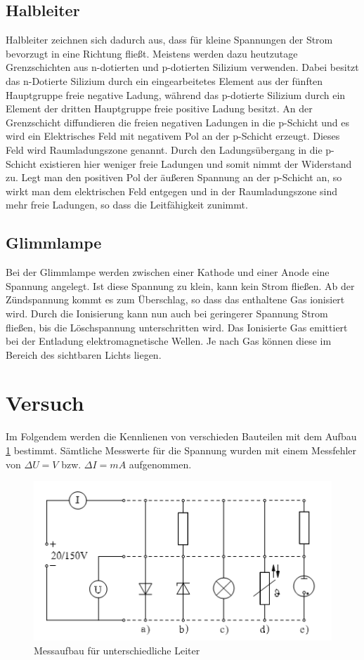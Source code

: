 \subsection{Halbleiter}
Halbleiter zeichnen sich dadurch aus, dass für kleine Spannungen der Strom bevorzugt in eine Richtung fließt. Meistens werden dazu heutzutage Grenzschichten aus n-dotierten und p-dotierten Silizium verwenden. Dabei besitzt das n-Dotierte Silizium durch ein eingearbeitetes Element aus der fünften Hauptgruppe freie negative Ladung, während das p-dotierte Silizium durch ein Element der dritten Hauptgruppe freie positive Ladung besitzt. An der Grenzschicht diffundieren die freien negativen Ladungen in die p-Schicht und es wird ein Elektrisches Feld mit negativem Pol an der p-Schicht erzeugt. Dieses Feld wird Raumladungszone genannt. Durch den Ladungsübergang in die p-Schicht existieren hier weniger freie Ladungen und somit nimmt der Widerstand zu. Legt man den positiven Pol der äußeren Spannung an der p-Schicht an, so wirkt man dem elektrischen Feld entgegen und in der Raumladungszone sind mehr freie Ladungen, so dass die Leitfähigkeit zunimmt.

\subsection{Glimmlampe}
Bei der Glimmlampe werden zwischen einer Kathode und einer Anode eine Spannung angelegt. Ist diese Spannung zu klein, kann kein Strom fließen. Ab der Zündspannung kommt es zum Überschlag, so dass das enthaltene Gas ionisiert wird. Durch die Ionisierung kann nun auch bei geringerer Spannung Strom fließen, bis die Löschspannung unterschritten wird. Das Ionisierte Gas emittiert bei der Entladung elektromagnetische Wellen. Je nach Gas können diese im Bereich des sichtbaren Lichts liegen. 

\section{Versuch}
Im Folgendem werden die Kennlienen von verschieden Bauteilen mit dem Aufbau \ref{fig:aufbau} bestimmt. Sämtliche Messwerte für die Spannung wurden mit einem Messfehler von $\Delta U = V$ bzw. $\Delta I = mA$ aufgenommen.
\begin{figure}[H]
	\centering
	\includegraphics[width=.8\textwidth]{Aufbau.png}
	\caption{Messaufbau für unterschiedliche Leiter}
	\label{fig:aufbau}
\end{figure}

